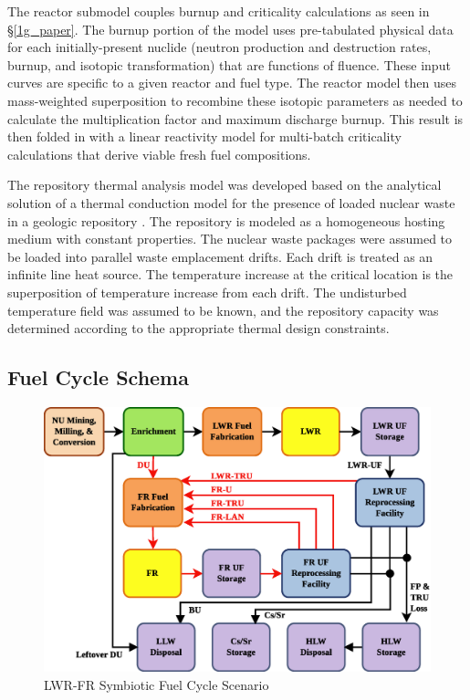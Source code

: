 The reactor submodel couples burnup and criticality calculations as seen in \S \ref{1g_paper}. The burnup portion of the
model uses pre-tabulated physical data for each initially-present nuclide (neutron production and destruction
rates, burnup, and isotopic transformation) that are functions of fluence. These input curves are specific to a
given reactor and fuel type. The reactor model then uses mass-weighted superposition to recombine these
isotopic parameters as needed to calculate the multiplication factor and maximum discharge burnup. This result is
then folded in with a linear reactivity model for multi-batch criticality calculations that derive viable
fresh fuel compositions.

The repository thermal analysis model was developed based on the
analytical solution of a thermal conduction model for the presence of
loaded nuclear waste in a geologic repository \cite{Li2010a}. The
repository is modeled as a homogeneous hosting medium with constant
properties. The nuclear waste packages were assumed to be loaded into parallel
waste emplacement drifts. Each drift is treated as
an infinite line heat source. The temperature increase at the critical
location is the superposition of temperature increase from each drift. The
undisturbed temperature field was assumed to be known, and the repository
capacity was determined according to the appropriate thermal design
constraints.



\subsection{Fuel Cycle Schema}
\label{cts_sec:fcschema}

\begin{figure}[htbp]
\begin{center}
\includegraphics[scale=0.50]{ct_sensitivity/figs/LWR_FR.eps}
\caption{LWR-FR Symbiotic Fuel Cycle Scenario}
\label{lwr_fr_fc}
\end{center}
\end{figure}

